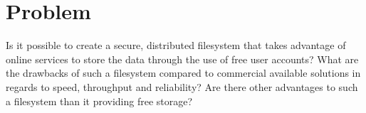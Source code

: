 
\section{Problem}
\label{sec:problem}

Is it possible to create a secure, distributed filesystem that takes advantage of online services to store the data through the use of free user accounts? What are the drawbacks of such a filesystem compared to commercial available solutions in regards to speed, throughput and reliability? Are there other advantages to such a filesystem than it providing free storage?



